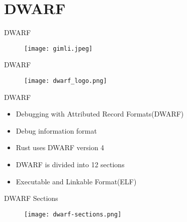 \section{DWARF}

\begin{frame}{DWARF}
	\begin{figure}
		\texttt{[image: gimli.jpeg]}
	\end{figure}
\end{frame}


\begin{frame}{DWARF}
	\begin{figure}
		\texttt{[image: dwarf\_logo.png]}
	\end{figure}
\end{frame}


\begin{frame}{DWARF}
    \begin{itemize}
	    \item Debugging with Attributed Record Formats(DWARF)
	    \item Debug information format
	    \item Rust uses DWARF version 4
	    \item DWARF is divided into 12 sections
	    \item Executable and Linkable Format(ELF)
    \end{itemize}
\end{frame}


\begin{frame}{DWARF Sections}
	\begin{figure}
		\texttt{[image: dwarf-sections.png]}
	\end{figure}
\end{frame}

